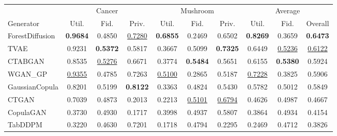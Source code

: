 \begin{tabular}{lccccccccc}
\toprule
 & \multicolumn{3}{c}{Cancer} & \multicolumn{3}{c}{Mushroom} & \multicolumn{3}{c}{Average} \\
\cmidrule(lr){2-4}\cmidrule(lr){5-7}\cmidrule(lr){8-10}
Generator & Util. & Fid. & Priv. & Util. & Fid. & Priv. & Util. & Fid. & Overall \\
\midrule
ForestDiffusion & \textbf{0.9684} & 0.4850 & \underline{0.7280} & \textbf{0.6855} & 0.2469 & 0.6502 & \textbf{0.8269} & 0.3659 & \textbf{0.6473} \\
TVAE & 0.9231 & \textbf{0.5372} & 0.5817 & 0.3667 & 0.5099 & \textbf{0.7325} & 0.6449 & \underline{0.5236} & \underline{0.6122} \\
CTABGAN & 0.8535 & \underline{0.5276} & 0.6671 & 0.3774 & \textbf{0.5484} & 0.5651 & 0.6155 & \textbf{0.5380} & 0.5924 \\
WGAN_GP & \underline{0.9355} & 0.4785 & 0.7263 & \underline{0.5100} & 0.2865 & 0.5187 & \underline{0.7228} & 0.3825 & 0.5906 \\
GaussianCopula & 0.8201 & 0.5199 & \textbf{0.8122} & 0.3363 & 0.4824 & 0.5430 & 0.5782 & 0.5012 & 0.5849 \\
CTGAN & 0.7039 & 0.4873 & 0.2013 & 0.2213 & \underline{0.5101} & \underline{0.6794} & 0.4626 & 0.4987 & 0.4667 \\
CopulaGAN & 0.3730 & 0.4930 & 0.1717 & 0.3998 & 0.4937 & 0.5807 & 0.3864 & 0.4934 & 0.4154 \\
TabDDPM & 0.3220 & 0.4630 & 0.7201 & 0.1718 & 0.4794 & 0.2295 & 0.2469 & 0.4712 & 0.3826 \\
\bottomrule
\end{tabular}
